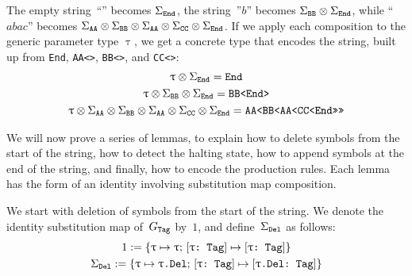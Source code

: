 \documentclass[../generics]{subfiles}
\begin{document}
\begin{example}
The empty string~``'' becomes $\Sigma_{\texttt{End}}$, the string~''$b$'' becomes $\Sigma_{\texttt{BB}}\otimes\Sigma_{\texttt{End}}$, while ``$abac$'' becomes $\Sigma_{\texttt{AA}}\otimes\Sigma_{\texttt{BB}}\otimes\Sigma_{\texttt{AA}}\otimes\Sigma_{\texttt{CC}}\otimes\Sigma_{\texttt{End}}$.
If we apply each composition to the generic parameter type $\uptau$, we get a concrete type that encodes the string, built up from \texttt{End}, \texttt{AA<>}, \texttt{BB<>}, and \texttt{CC<>}:
\begin{gather*}
\uptau\otimes\Sigma_{\texttt{End}} = \texttt{End}\\
\uptau\otimes\Sigma_{\texttt{BB}}\otimes\Sigma_{\texttt{End}} = \texttt{BB<End>}\\
\uptau\otimes\Sigma_{\texttt{AA}}\otimes\Sigma_{\texttt{BB}}\otimes\Sigma_{\texttt{AA}}\otimes\Sigma_{\texttt{CC}}\otimes\Sigma_{\texttt{End}} = \texttt{AA<BB<AA<CC<End>>>>}
\end{gather*}
\end{example}

We will now prove a series of lemmas, to explain how to delete symbols from the start of the string, how to detect the halting state, how to append symbols at the end of the string, and finally, how to encode the production rules. Each lemma has the form of an identity involving substitution map composition.

We start with deletion of symbols from the start of the string. We denote the identity substitution map of~$G_\texttt{Tag}$ by~$1$, and define~$\Sigma_{\texttt{Del}}$ as follows:
\begin{gather*}
1 := \{\texttt{$\uptau$} \mapsto \texttt{$\uptau$};\,[\texttt{$\uptau$:~Tag}] \mapsto [\texttt{$\uptau$:~Tag}]\}\\
\Sigma_{\texttt{Del}} := \{\texttt{$\uptau$} \mapsto \texttt{$\uptau$.Del};\,[\texttt{$\uptau$:~Tag}] \mapsto [\texttt{$\uptau$.Del:~Tag}]\}
\end{gather*}
\end{document}

